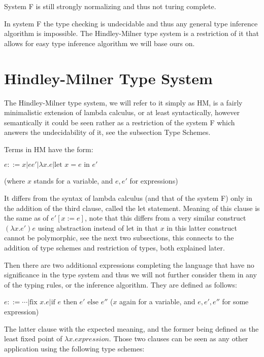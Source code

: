 System F is still strongly normalizing and thus not turing complete. %

In system F the type checking is undecidable and thus any general type inference algorithm is impossible.
The Hindley-Milner type system is a restriction of it %
that allows for easy type inference algorithm we will base ours on.

\section{Hindley-Milner Type System}

The Hindley-Milner type system, we will refer to it simply as HM, is a fairly minimalistic extension of lambda calculus, or at least syntactically, however semantically it could be seen rather as a restriction of the system F which answers the undecidability of it, see the subsection Type Schemes. %

Terms in HM have the form:

$e ::= x | e e' | \lambda x . e | \text{let } x = e \text{ in } e'$

(where $x$ stands for a variable, and $e, e'$ for expressions)

It differs from the syntax of lambda calculus (and that of the system F) only in the addition of the third clause, called the let statement. Meaning of this clause is the same as of $e' [x := e]$, note that this differs from a very similar construct $(\lambda x . e') e$ using abstraction instead of let in that $x$ in this latter construct cannot be polymorphic, see the next two subsections, this connects to the addition of type schemes and restriction of types, both explained later. %

Then there are two additional expressions completing the language that have no significance in the type system and thus we will not further consider them in any of the typing rules, or the inference algorithm. They are defined as follows: %

$e ::= \cdots | \text{fix } x . e | \text{if } e \text{ then } e' \text{ else } e''$
($x$ again for a variable, and $e, e', e''$ for some expression)

The latter clause with the expected meaning, and the former being defined as the least fixed point of $\lambda x . expression$. Those two clauses can be seen as any other application using the following type schemes:


